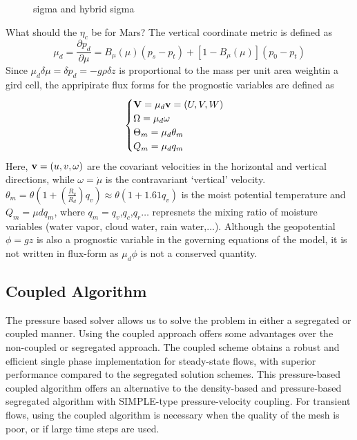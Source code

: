 \documentclass{article}
\begin{document}
\begin{sloppypar}
\begin{figure}
    \caption{sigma and hybrid sigma}
    \label{fig:3}
\end{figure}
\newline
What should the $\eta_c$ be for Mars? \newline
The vertical coordinate metric is defined as
\begin{equation}
    \mu_d=\frac{\partial{p_d}}{\partial{\mu}}=B_{\mu}(\mu)(p_s-p_t)+[1-B_{\mu}(\mu)](p_0-p_t)
\end{equation}
Since $\mu_d\delta\mu=\delta p_d=-g\rho\delta{z}$ is proportional to the mass per unit area weightin
a gird cell, the appripirate flux forms for the prognostic variables are defined as
\begin{equation}
    \begin{cases}
        \boldsymbol{{\rm V}}={\mu_d}\boldsymbol{{\rm v}}=(U,V,W)       \\
        \Omega=\mu_d\omega     \\
        \Theta_m=\mu_d\theta_m \\
        Q_m={\mu_d}{q_m}
    \end{cases}
\end{equation}
Here, $\boldsymbol{{\rm v}}=(u,v,\omega)$ are the covariant velocities in the horizontal and vertical directions, while $\omega=\dot{\mu}$ is
the contravariant `vertical' velocity. $\theta_m=\theta(1+(\frac{R_v}{R_d})q_v)\approx\theta(1+1.61q_v)$ is the moist potential
temperature and $Q_m=\mu{dq_m}$, where $q_m=q_v$,$q_c$,$q_r$$\ldots$
represnets the mixing ratio of moisture variables (water vapor, cloud water, rain water,$\ldots$).
Although the geopotential $\phi=gz$ is also a prognostic variable in the governing equations of the model, it is not written in flux-form 
as $\mu_d\phi$ is not a conserved quantity.

\subsection{Coupled Algorithm}
The pressure based solver allows us to solve the problem in either a segregated or coupled manner. Using the coupled approach offers 
some advantages over the non-coupled or segregated approach. The coupled scheme obtains a robust and efficient single phase implementation
for steady-state flows, with superior performance compared to the segregated solution schemes. This pressure-based coupled algorithm
offers an alternative to the density-based and pressure-based segregated algorithm with SIMPLE-type pressure-velocity coupling. For 
transient flows, using the coupled algorithm is necessary when the quality of the mesh is poor, or if large time steps are used.


\end{sloppypar}
\end{document}
